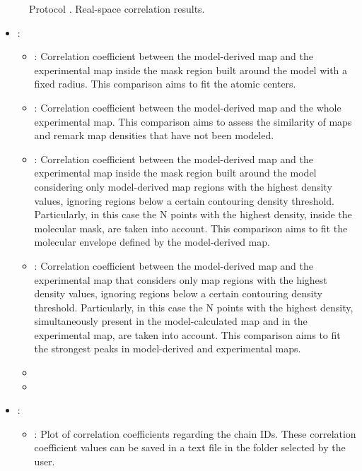 \begin{itemize}
\begin{itemize}
\begin{figure}[H]
         \caption{Protocol . Real-space correlation results.}
         \label{fig:validationCryoEM_protocol_5}
        \end{figure}
        \begin{itemize}
         \item {} \citep{afonine2018b}: 
         \begin{itemize}  
          \item {}: Correlation coefficient between the model-derived map and the experimental map inside the mask region built around the model with a fixed radius. This comparison aims to fit the atomic centers.
          \item {}: Correlation coefficient between the model-derived map and the whole experimental map. This comparison aims to assess the similarity of maps and remark map densities that have not been modeled.
          \item {}: Correlation coefficient between the model-derived map and the experimental map inside the mask region built around the model considering only model-derived map regions with the highest density values, ignoring regions below a certain contouring density threshold. Particularly, in this case the N points with the highest density, inside the molecular mask, are taken into account. This comparison aims to fit the molecular envelope defined by the model-derived map.
          \item {}: Correlation coefficient between the model-derived map and the experimental map that considers only map regions with the highest density values, ignoring regions below a certain contouring density threshold. Particularly, in this case the N points with the highest density, simultaneously present in the model-calculated map and in the experimental map, are taken into account. This comparison aims to fit the strongest peaks in model-derived and experimental maps.
          \item {}
          \item {}
         \end{itemize}
         \item {}:
         \begin{itemize}
           \item {}: Plot of correlation coefficients regarding the chain IDs. These correlation coefficient values can be saved in a text file in the folder selected by the user.

\end{itemize}
\end{itemize}
\end{itemize}
\end{itemize}
